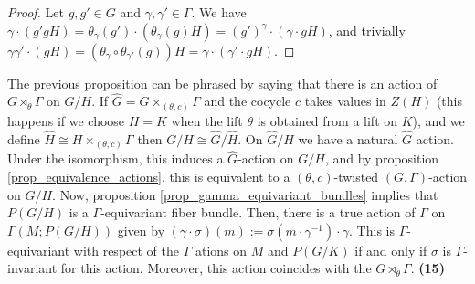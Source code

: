 \begin{proof}
    Let \(g,g'\in G\) and \(\gamma, \gamma'\in \Gamma\). We have \(\gamma\cdot (g'g H)=\theta_\gamma(g')\cdot (\theta_{\gamma}(g) H)=(g')^\gamma\cdot (\gamma \cdot gH)\), and trivially \(\gamma\gamma'\cdot (gH)=(\theta_{\gamma}\circ  \theta_{\gamma'}(g)) H=\gamma \cdot (\gamma' \cdot gH)\).
\end{proof}
The previous proposition can be phrased by saying that there is an action of \(G \rtimes_\theta \Gamma\) on \(G/H\). If \(\hat{G}=G \times_{(\theta, c)}\Gamma\) and the cocycle \(c\) takes values in \(Z(H)\) (this happens if we choose \(H=K\) when the lift \(\theta\) is obtained from a lift on \(K\)), and we define \(\hat{H}\cong H \times_{(\theta, c)} \Gamma\) then \(G/H \cong \hat{G}/\hat{H}\). On \(\hat{G}/\hat{H}\) we have a natural \(\hat{G}\) action. Under the isomorphism, this induces a \(\hat{G}\)-action on \(G/H\), and by proposition \ref{prop_equivalence_actions}, this is equivalent to a \((\theta, c)\)-twisted \((G, \Gamma)\)-action on \(G/H\). Now, proposition \ref{prop_gamma_equivariant_bundles} implies that \(P(G/H)\) is a \(\Gamma\)-equivariant fiber bundle. Then, there is a true action of \(\Gamma\) on \(\Gamma(M; P(G/H))\) given by \((\gamma\cdot \sigma)(m):=\sigma(m\cdot \gamma^{-1})\cdot \gamma\). This is \(\Gamma\)-equivariant with respect of the \(\Gamma\) ations on \(M\) and \(P(G/K)\) if and only if \(\sigma\) is \(\Gamma\)-invariant for this action. Moreover, this action coincides with the \(G \rtimes_\theta \Gamma\). {\color{purple}\textbf{(15)}}

